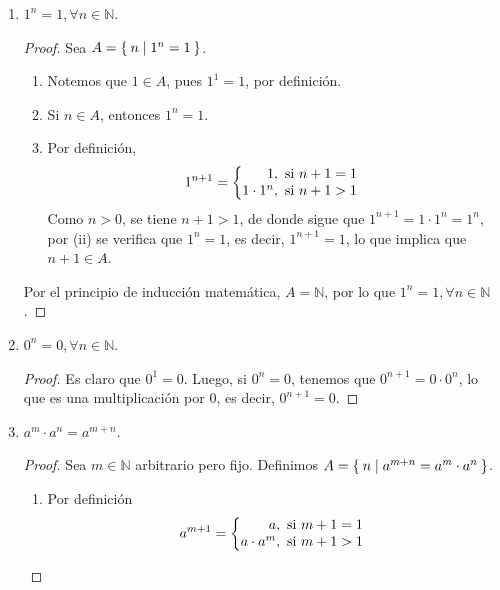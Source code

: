 \documentclass[11pt]{article}
\newcommand{\N}{\mathbb{N}}
\let\set\Set
\begin{document}
\begin{enumerate}[label=\alph*)]
  \item $1^n=1, \forall n\in \N$.
  \vspace{-1em}
  \begin{proof} Sea $A=\set{n|1^n=1}$.
  \begin{enumerate}[label=\roman*)]
  \item Notemos que $1\in A$, pues $1^1=1$, por definición.
  \item Si $n\in A$, entonces $1^n=1$.
  \item Por definición, \begin{align*}
  1^{n+1} = \left\{
  \begin{array}{@{}r@{\thinspace}l}
    1, &  \ \text{si}  \ n+1 = 1\\
    1\cdot 1^{n}, &  \ \text{si}  \ n+1 > 1
  \end{array} \right.
  \end{align*}
 Como $n>0$, se tiene $n+1>1$, de donde sigue que $1^{n+1}=1\cdot 1^n=1^n$, por (ii) se verifica que $1^n=1$, es decir, $1^{n+1}=1$, lo que implica que $n+1\in A$.
 \end{enumerate}

 Por el principio de inducción matemática, $A=\N$, por lo que $1^n=1, \forall n\in \N$.
 \end{proof}

 \item $0^n=0, \forall n\in \N$.
 \begin{proof}
 Es claro que $0^1=0$. Luego, si $0^n=0$, tenemos que $0^{n+1}=0 \cdot 0^n$, lo que es una multiplicación por $0$, es decir, $0^{n+1}=0$.
 \end{proof}
 
  \item $a^m \cdot a^n = a^{m+n}$.

 \begin{proof} Sea $m\in \N$ arbitrario pero fijo. Definimos $A=\set{n|a^{m+n}=a^m\cdot a^n}$.

 \begin{enumerate}[label=\roman*)]
 \item Por definición \begin{align*}
  a^{m+1} = \left\{
  \begin{array}{@{}r@{\thinspace}l}
    a, &  \ \text{si}  \ m+1 = 1\\
    a\cdot a^{m}, &  \ \text{si}  \ m+1 > 1
  \end{array} \right.
  \end{align*}
  

\end{enumerate}
\end{proof}
\end{enumerate}
\end{document}
